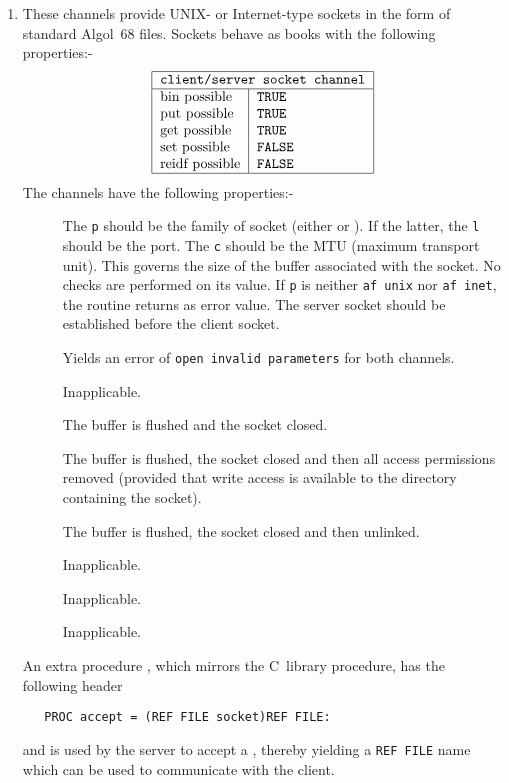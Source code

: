 \begin{enumerate}
\item {}\newline
\hypertarget{stan-sockch}{}\label{stan-sockch}\newline
These channels provide UNIX- or Internet-type sockets in the form
of standard Algol~68 files.
Sockets behave as books with the following properties:-
$$\begin{tabular}{|l|l|}\hline
  \multicolumn{2}{|c|}{\texttt{client/server socket channel}}\\ \hline
  bin possible & \texttt{TRUE}\\
  put possible & \texttt{TRUE}\\
  get possible & \texttt{TRUE}\\
  set possible & \texttt{FALSE}\\
  reidf possible & \texttt{FALSE}\\ \hline
  \end{tabular}
$$
The channels have the following properties:-
\begin{description}
\item[] The \verb|p| should be the family of socket (either
 or ). If the latter, the \verb|l| should
be the port. The \verb|c| should be the MTU (maximum transport unit).
This governs the size of the buffer associated with the socket. No
checks are performed on its value. If \verb|p| is neither \verb|af unix|
nor \verb|af inet|, the routine returns  as error value. The server socket should be established
before the client socket.
\item[] Yields an error of \verb|open invalid parameters| for
both channels.
\item[] Inapplicable.
\item[] The buffer is flushed and the socket closed.
\item[]  The buffer is flushed, the socket closed and then all
access permissions removed (provided that write access is available to
the directory containing the socket).
\item[] The buffer is flushed, the socket closed and then
unlinked.
\item[] Inapplicable.
\item[] Inapplicable.
\item[] Inapplicable.
\end{description}
An extra procedure , which mirrors the C~library procedure,
has the following header
\begin{verbatim}
   PROC accept = (REF FILE socket)REF FILE:
\end{verbatim}
\noindent
and is used by the server to accept a , thereby
yielding a \verb|REF FILE| name which can be used to communicate with
the client.


\end{enumerate}
